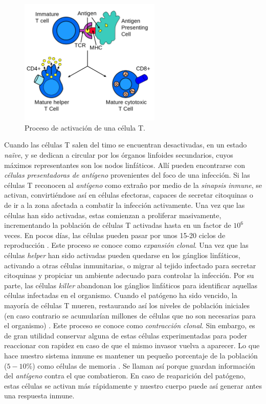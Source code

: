 \begin{figure}[t]
	\centering
	\includegraphics[width=0.6\textwidth]{Imagenes/EstadoDeLaCuestion/Antigen_presentation}
	\caption{Proceso de activación de una célula T.}
	\label{fig:antigen_presentation}
\end{figure}


Cuando las células T salen del timo se encuentran desactivadas, en un estado \textit{naïve}, y se dedican a circular por los órganos linfoides secundarios, cuyos máximos representantes son los nodos linfáticos. Allí pueden encontrarse con \textit{células presentadoras de antígeno} provenientes del foco de una infección. Si las células T reconocen al \textit{antígeno} como extraño por medio de la \textit{sinapsis inmune}, se activan, convirtiéndose así en células efectoras, capaces de secretar citoquinas o de ir a la zona afectada a combatir la infección activamente. Una vez que las células han sido activadas, estas comienzan a proliferar masivamente, incrementando la población de células T activadas hasta en un factor de $10^6$ veces. En pocos días, las células pueden pasar por unos 15-20 ciclos de reproducción \citep{JTB}. Este proceso se conoce como \textit{expansión clonal}. Una vez que las células \textit{helper} han sido activadas pueden quedarse en los gánglios linfáticos, activando a otras células inmunitarias, o migrar al tejido infectado para secretar citoquinas y propiciar un ambiente adecuado para controlar la infección. Por su parte, las células \textit{killer} abandonan los gánglios linfáticos para identificar aquellas células infectadas en el organismo. Cuando el patógeno ha sido vencido, la mayoría de células T mueren, restaurando así los niveles de población iniciales (en caso contrario se acumularían millones de células que no son necesarias para el organismo) \citep{fernandez2012mecanica}. Este proceso se conoce como \textit{contracción clonal}. Sin embargo, es de gran utilidad conservar alguna de estas células experimentadas para poder reaccionar con rapidez en caso de que el mismo invasor vuelva a aparecer. Lo que hace nuestro sistema inmune es mantener un pequeño porcentaje de la población  ($5-10\%$) como células de memoria \citep{JTB}. Se llaman así porque guardan información del \textit{antígeno} contra el que combatieron. En caso de reaparición del patógeno, estas células se activan más rápidamente y nuestro cuerpo puede así generar antes una respuesta inmune.

